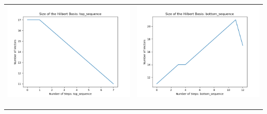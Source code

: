 \documentclass[10pt]{article}
\begin{document}
\begin{tabular}{c|c}
\begin{minipage}{.4\textwidth}
\includegraphics[width=\textwidth]{"DATA/5d/6 generators 2 bound J/top_sequence SIZE"}
\end{minipage} &
\begin{minipage}{.4\textwidth}
\includegraphics[width=\textwidth]{"DATA/5d/6 generators 2 bound J bottomup/bottom_sequence SIZE"}
\end{minipage} \\ \\
\hline \\\begin{minipage}{.4\textwidth}

\end{minipage}
\end{tabular}
\end{document}
